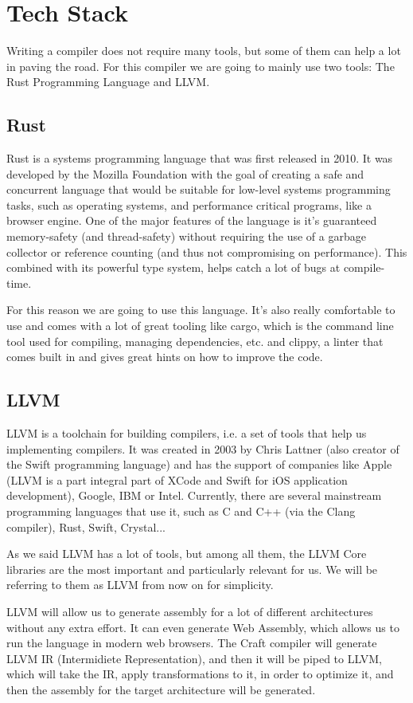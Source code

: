 ﻿\documentclass[10pt,a4paper,twocolumn,twoside]{article}
\begin{document}
\section{Tech Stack}

Writing a compiler does not require many tools, but some of them can help a lot
in paving the road. For this compiler we are going to mainly use two tools: 
The Rust Programming Language and LLVM.

\subsection{Rust}
Rust is a systems programming language that was first released in 2010. It was
developed by the Mozilla Foundation with the goal of creating a safe and
concurrent language that would be suitable for low-level systems programming
tasks, such as operating systems, and performance critical programs, like a
browser engine. One of the major features of the language is it's guaranteed
memory-safety (and thread-safety) without requiring the use of a garbage
collector or reference counting (and thus not compromising on performance).
This combined with its powerful type system, helps catch a lot of bugs at 
compile-time.

For this reason we are going to use this language. It's also really comfortable
to use and comes with a lot of great tooling like cargo, which is the command 
line tool used for compiling, managing dependencies, etc. and clippy, a linter
that comes built in and gives great hints on how to improve the code.

\subsection{LLVM}
LLVM is a toolchain for building compilers, i.e. a set of tools that help us
implementing compilers. It was created in 2003 by Chris Lattner (also creator of
the Swift programming language) and has the support of companies like Apple
(LLVM is a part integral part of XCode and Swift for iOS application
development), Google, IBM or Intel. Currently, there are several mainstream
programming languages that use it, such as C and C++ (via the Clang compiler),
Rust, Swift, Crystal...

As we said LLVM has a lot of tools, but among all them, the LLVM Core libraries
are the most important and particularly relevant for us. We will be referring to 
them as LLVM from now on for simplicity. 

LLVM will allow us to generate assembly for a lot of different architectures
without any extra effort. It can even generate Web Assembly, which allows us to
run the language in modern web browsers. The Craft compiler will generate LLVM
IR (Intermidiete Representation), and then it will be piped to LLVM, which will
take the IR, apply transformations to it, in order to optimize it, and then
the assembly for the target architecture will be generated.
\end{document}
